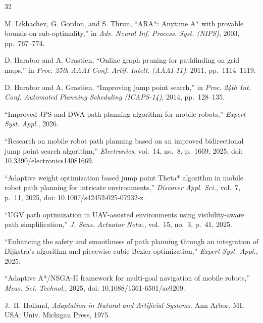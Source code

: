 \documentclass[lettersize,journal]{IEEEtran}
\begin{document}
\begin{thebibliography}{32}

M. Likhachev, G. Gordon, and S. Thrun, ``ARA*: Anytime A* with provable bounds on sub-optimality,'' in \textit{Adv. Neural Inf. Process. Syst. (NIPS)}, 2003, pp.~767--774.


D. Harabor and A. Grastien, ``Online graph pruning for pathfinding on grid maps,'' in \textit{Proc. 25th AAAI Conf. Artif. Intell. (AAAI-11)}, 2011, pp.~1114--1119.


D. Harabor and A. Grastien, ``Improving jump point search,'' in \textit{Proc. 24th Int. Conf. Automated Planning Scheduling (ICAPS-14)}, 2014, pp.~128--135.


``Improved JPS and DWA path planning algorithm for mobile robots,'' \textit{Expert Syst. Appl.}, 2026.


``Research on mobile robot path planning based on an improved bidirectional jump point search algorithm,'' \textit{Electronics}, vol.~14, no.~8, p.~1669, 2025, doi: 10.3390/electronics14081669.


``Adaptive weight optimization based jump point Theta* algorithm in mobile robot path planning for intricate environments,'' \textit{Discover Appl. Sci.}, vol.~7, p.~11, 2025, doi: 10.1007/s42452-025-07932-z.


``UGV path optimization in UAV-assisted environments using visibility-aware path simplification,'' \textit{J. Sens. Actuator Netw.}, vol.~15, no.~3, p.~41, 2025.


``Enhancing the safety and smoothness of path planning through an integration of Dijkstra's algorithm and piecewise cubic Bezier optimization,'' \textit{Expert Syst. Appl.}, 2025.


``Adaptive A*/NSGA-II framework for multi-goal navigation of mobile robots,'' \textit{Meas. Sci. Technol.}, 2025, doi: 10.1088/1361-6501/ae9209.


J.~H. Holland, \textit{Adaptation in Natural and Artificial Systems}. Ann Arbor, MI, USA: Univ. Michigan Press, 1975.



\end{thebibliography}
\end{document}
